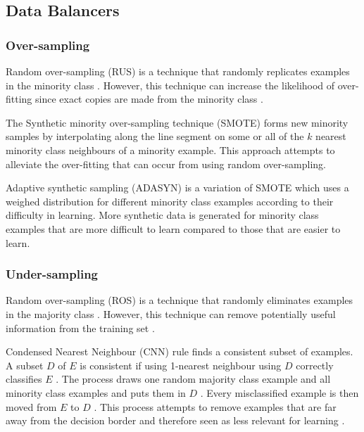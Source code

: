 \documentclass{sig-alternate-05-2015}
\begin{document}
	\subsection{Data Balancers}
	\subsubsection{Over-sampling}
	Random over-sampling (RUS) is a technique that randomly replicates examples in the minority class \cite{Batista:2004:SBS:1007730.1007735}. However, this technique can increase the likelihood of over-fitting since exact copies are made from the minority class \cite{Batista:2004:SBS:1007730.1007735}.
	
	The Synthetic minority over-sampling technique (SMOTE) \cite{Chawla:2002:SSM:1622407.1622416} forms new minority samples by interpolating along the line segment on some or all of the $k$ nearest minority class neighbours of a minority example. This approach attempts to alleviate the over-fitting that can occur from using random over-sampling.
	
	Adaptive synthetic sampling (ADASYN) \cite{4633969} is a variation of SMOTE which uses a weighed distribution for different minority class examples according to their difficulty in learning. More synthetic data is generated for minority class examples that are more difficult to learn compared to those that are easier to learn.
	
	\subsubsection{Under-sampling}
	Random over-sampling (ROS) is a technique that randomly eliminates examples in the majority class \cite{Batista:2004:SBS:1007730.1007735}. However, this technique can remove potentially useful information from the training set \cite{Batista:2004:SBS:1007730.1007735}. 
	
	Condensed Nearest Neighbour (CNN) rule \cite{1056066} finds a consistent subset of examples. A subset $D$ of $E$ is consistent if using 1-nearest neighbour using $D$ correctly classifies $E$ \cite{Batista:2004:SBS:1007730.1007735}. The process draws one random majority class example and all minority class examples and puts them in $D$ \cite{Batista:2004:SBS:1007730.1007735}. Every misclassified example is then moved from $E$ to $D$ \cite{Batista:2004:SBS:1007730.1007735}. This process attempts to remove examples that are far away from the decision border and therefore seen as less relevant for learning \cite{Batista:2004:SBS:1007730.1007735}.
	
\end{document}
